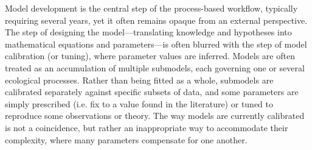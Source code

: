 \documentclass[11pt]{article}
\begin{document}
\begin{tcolorbox}
{\begin{multicols}{2}
\begin{minipage}[t]{\linewidth}
    \vspace*{1mm}
\end{minipage}

\noindent %
Model development is the central step of the process-based workflow, typically requiring several years, yet it often remains opaque from an external perspective. The step of designing the model---translating knowledge and hypotheses into mathematical equations and parameters---is often blurred with the step of model calibration (or tuning), where parameter values are inferred. Models are often treated as an accumulation of multiple submodels, each governing one or several ecological processes. Rather than being fitted as a whole, submodels are calibrated separately against specific subsets of data, and some parameters are simply prescribed (i.e. fix to a value found in the literature) or tuned to reproduce some observations or theory. The way models are currently calibrated is not a coincidence, but rather an inappropriate way to accommodate their complexity, where many parameters compensate for one another. %

\vfill

\end{multicols}}


\end{tcolorbox}
\end{document}
